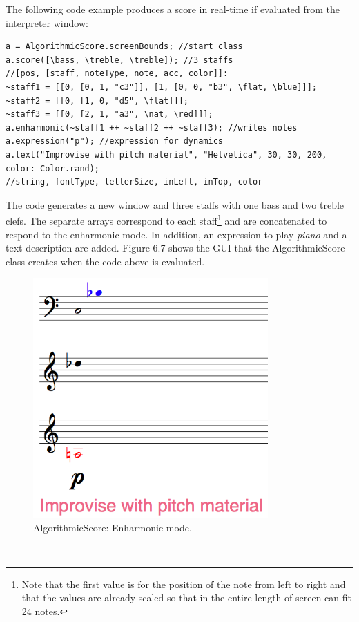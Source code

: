 The following code example produces a score in real-time if evaluated from the interpreter window: 
\begin{verbatim}
a = AlgorithmicScore.screenBounds; //start class
a.score([\bass, \treble, \treble]); //3 staffs
//[pos, [staff, noteType, note, acc, color]]:
~staff1 = [[0, [0, 1, "c3"]], [1, [0, 0, "b3", \flat, \blue]]]; 
~staff2 = [[0, [1, 0, "d5", \flat]]];
~staff3 = [[0, [2, 1, "a3", \nat, \red]]];
a.enharmonic(~staff1 ++ ~staff2 ++ ~staff3); //writes notes
a.expression("p"); //expression for dynamics
a.text("Improvise with pitch material", "Helvetica", 30, 30, 200, color: Color.rand);
//string, fontType, letterSize, inLeft, inTop, color  
\end{verbatim}
The code generates a new window and three staffs with one bass and two treble clefs. The separate arrays correspond to each staff\footnote{Note that the first value is for the position of the note from left to right and that the values are already scaled so that in the entire length of screen can fit 24 notes.} and are concatenated to respond to the enharmonic mode. In addition, an expression to play \emph{piano} and a text description are added. Figure 6.7 shows the GUI that the AlgorithmicScore class creates when the code above is evaluated. 
\begin{figure}[htbp] %
   \centering
   \includegraphics[width=9cm]{Chapter6/algoscore1.tif} %
   \caption{AlgorithmicScore: Enharmonic mode.}
   \label{fig:example}
\end{figure}\

